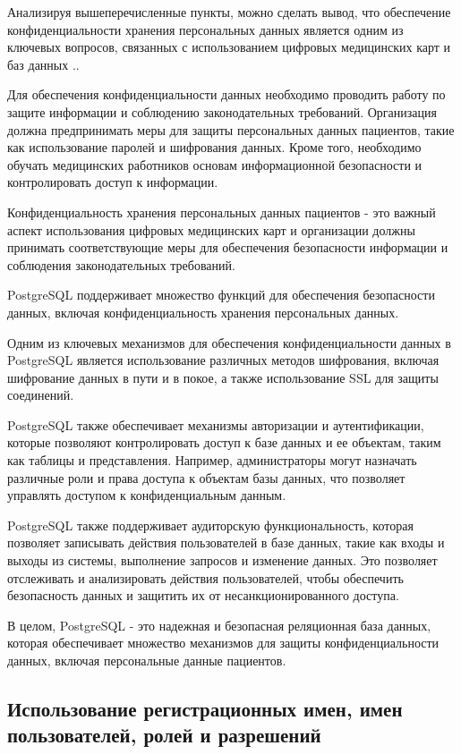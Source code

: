 Анализируя вышеперечисленные пункты, можно сделать вывод, что обеспечение конфиденциальности хранения персональных данных является одним из ключевых вопросов, связанных с использованием цифровых медицинских карт и баз данных \cite{online6}..

Для обеспечения конфиденциальности данных необходимо проводить работу по защите информации и соблюдению законодательных требований. Организация должна предпринимать меры для защиты персональных данных пациентов, такие как использование паролей и шифрования данных. Кроме того, необходимо обучать медицинских работников основам информационной безопасности и контролировать доступ к информации.

Конфиденциальность хранения персональных данных пациентов - это важный аспект использования цифровых медицинских карт и организации должны принимать соответствующие меры для обеспечения безопасности информации и соблюдения законодательных требований.

PostgreSQL поддерживает множество функций для обеспечения безопасности данных, включая конфиденциальность хранения персональных данных.

Одним из ключевых механизмов для обеспечения конфиденциальности данных в PostgreSQL является использование различных методов шифрования, включая шифрование данных в пути и в покое, а также использование SSL для защиты соединений.

PostgreSQL также обеспечивает механизмы авторизации и аутентификации, которые позволяют контролировать доступ к базе данных и ее объектам, таким как таблицы и представления. Например, администраторы могут назначать различные роли и права доступа к объектам базы данных, что позволяет управлять доступом к конфиденциальным данным.

PostgreSQL также поддерживает аудиторскую функциональность, которая позволяет записывать действия пользователей в базе данных, такие как входы и выходы из системы, выполнение запросов и изменение данных. Это позволяет отслеживать и анализировать действия пользователей, чтобы обеспечить безопасность данных и защитить их от несанкционированного доступа.

В целом, PostgreSQL - это надежная и безопасная реляционная база данных, которая обеспечивает множество механизмов для защиты конфиденциальности данных, включая персональные данные пациентов.




\subsection{Использование регистрационных имен, имен пользователей, ролей и разрешений}


